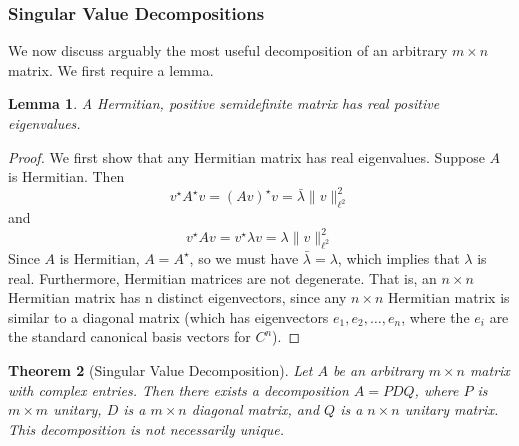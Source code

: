 \documentclass[12pt,reqno]{amsart}
\numberwithin{equation}{section}  %
\newtheorem{theorem}{Theorem}
\newtheorem{lemma}[theorem]{Lemma}
\begin{document}
\subsubsection{Singular Value Decompositions}
We now discuss arguably the most useful decomposition of an arbitrary $m \times
n$ matrix. We first require a lemma.
\begin{lemma}
\label{lem:hermite}
A Hermitian, positive semidefinite matrix has real positive eigenvalues.
\end{lemma}
\begin{proof}
We first show that any Hermitian matrix has real eigenvalues. Suppose $A$ is Hermitian.
Then
\begin{equation*}
v^{\star} A^{\star} v = (A v)^{\star} v = \bar{\lambda} \| v \|_{\ell^2}^{2}
\end{equation*}
and
\begin{equation*}
 v^{\star} A v = v^{\star} \lambda v =  \lambda \| v \|_{\ell^2}^{2}
 \end{equation*}
 Since $A$ is Hermitian, $A = A^{\star}$, so we must have $\bar{\lambda} =
\lambda$, which implies that $\lambda$ is real. Furthermore, Hermitian matrices
are not degenerate. That is, an $n \times n$ Hermitian matrix has n distinct
eigenvectors, since any $n \times n$ Hermitian matrix is similar to a diagonal matrix (which
has eigenvectors $e_1, e_2, \ldots, e_n$, where the $e_i$ are the standard 
canonical basis vectors for $C^n$). 
\end{proof}
\begin{theorem}[Singular Value Decomposition]
Let $A$ be an arbitrary $m \times n$ matrix with complex entries.
Then there exists a decomposition $A = PDQ$, where $P$ is $m \times m$ unitary,
$D$ is a $m \times n$ diagonal matrix, and $Q$ is a $n \times n$ unitary matrix.
This decomposition is not necessarily unique.
\end{theorem} 
\end{document}
